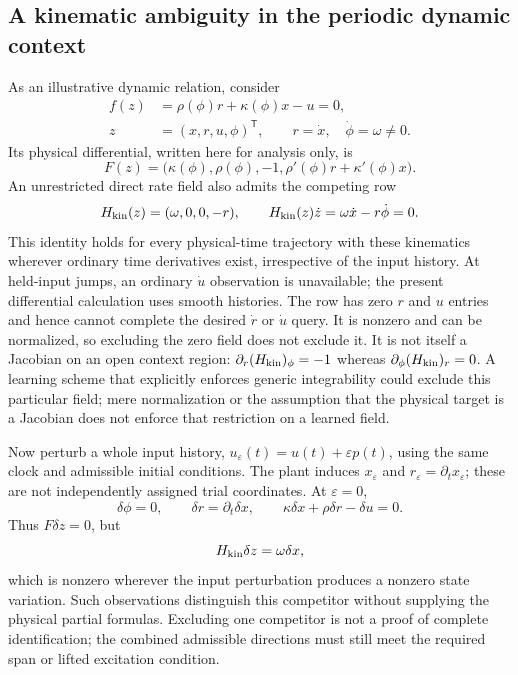 \subsection{A kinematic ambiguity in the periodic dynamic context}
As an illustrative dynamic relation, consider
\begin{equation}
 \begin{aligned}
 f(z)&=\rho(\phi)r+\kappa(\phi)x-u=0,\\
 z&=(x,r,u,\phi)^{\mathsf T},\qquad
 r=\dot x,\quad\dot\phi=\omega\ne0.
 \end{aligned}
 \label{eq:tv_periodic_context}
\end{equation}
Its physical differential, written here for analysis only, is
\begin{equation}
 F(z)=\bigl(\kappa(\phi),\rho(\phi),-1,
                \rho'(\phi)r+\kappa'(\phi)x\bigr).
 \label{eq:tv_periodic_differential}
\end{equation}
An unrestricted direct rate field also admits the competing row
\begin{equation}
 H_{\rm kin}(z)=(\omega,0,0,-r),\qquad
 H_{\rm kin}(z)\dot z=\omega\dot x-r\dot\phi=0.
 \label{eq:tv_kinematic_competitor}
\end{equation}
This identity holds for every physical-time trajectory with these
kinematics wherever ordinary time derivatives exist, irrespective of the
input history. At held-input jumps, an ordinary $\dot u$ observation is
unavailable; the present differential calculation uses smooth histories.
The row has zero $r$ and $u$ entries and hence cannot complete the desired
$\dot r$ or $\dot u$ query.
It is nonzero and can be normalized, so excluding the zero field does not
exclude it. It is not itself a Jacobian on an open context region:
$\partial_r(H_{\rm kin})_\phi=-1$ whereas
$\partial_\phi(H_{\rm kin})_r=0$. A learning scheme that explicitly enforces
generic integrability could exclude this particular field; mere
normalization or the assumption that the physical target is a Jacobian
does not enforce that restriction on a learned field.

Now perturb a whole input history,
$u_\varepsilon(t)=u(t)+\varepsilon p(t)$, using the same clock and admissible
initial conditions. The plant induces $x_\varepsilon$ and
$r_\varepsilon=\partial_t x_\varepsilon$; these are not independently
assigned trial coordinates. At $\varepsilon=0$,
\begin{equation}
 \delta\phi=0,\qquad \delta r=\partial_t\delta x,\qquad
 \kappa\delta x+\rho\delta r-\delta u=0.
 \label{eq:tv_periodic_trial}
\end{equation}
Thus $F\delta z=0$, but
\begin{equation}
 H_{\rm kin}\delta z=\omega\delta x,
 \label{eq:tv_periodic_separation}
\end{equation}
which is nonzero wherever the input perturbation produces a nonzero state
variation. Such observations distinguish this competitor without supplying
the physical partial formulas. Excluding one competitor is not a proof of
complete identification; the combined admissible directions must still
meet the required span or lifted excitation condition.

